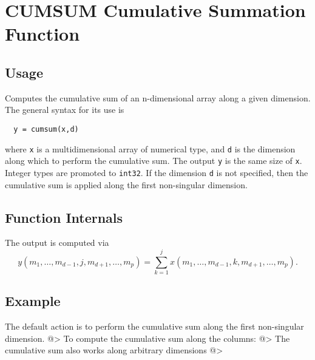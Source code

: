 \section{CUMSUM Cumulative Summation Function}

\subsection{Usage}

Computes the cumulative sum of an n-dimensional array along a given
dimension.  The general syntax for its use is
\begin{verbatim}
  y = cumsum(x,d)
\end{verbatim}
where \verb|x| is a multidimensional array of numerical type, and \verb|d|
is the dimension along which to perform the cumulative sum.  The
output \verb|y| is the same size of \verb|x|.  Integer types are promoted
to \verb|int32|. If the dimension \verb|d| is not specified, then the
cumulative sum is applied along the first non-singular dimension.
\subsection{Function Internals}

The output is computed via
\[
  y(m_1,\ldots,m_{d-1},j,m_{d+1},\ldots,m_{p}) = 
  \sum_{k=1}^{j} x(m_1,\ldots,m_{d-1},k,m_{d+1},\ldots,m_{p}).
\]
\subsection{Example}

The default action is to perform the cumulative sum along the
first non-singular dimension.
@>
To compute the cumulative sum along the columns:
@>
The cumulative sum also works along arbitrary dimensions
@>
